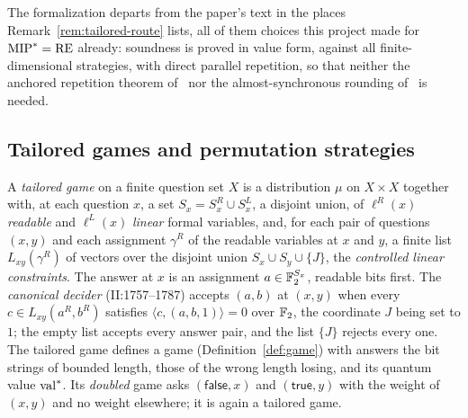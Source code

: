 The formalization departs from the paper's text in the places Remark~\ref{rem:tailored-route}
lists, all of them choices this project made for $\mathrm{MIP}^* = \mathrm{RE}$ already: soundness is proved
in value form, against all finite-dimensional strategies, with direct parallel repetition, so
that neither the anchored repetition theorem of~\cite{BVY17} nor the almost-synchronous
rounding of~\cite{Vid22} is needed.

\subsection{Tailored games and permutation strategies}

\begin{definition}
\label{def:tailored-game}
\leanok
A \emph{tailored game} on a finite question set $X$ is a distribution $\mu$ on $X \times X$
together with, at each question $x$, a set $S_x = S_x^R \cup S_x^L$, a disjoint union, of $\ell^R(x)$
\emph{readable} and $\ell^L(x)$ \emph{linear} formal variables, and, for each pair of questions
$(x, y)$ and each assignment $\gamma^R$ of the readable variables at $x$ and $y$, a finite list
$L_{xy}(\gamma^R)$ of vectors over the disjoint union $S_x \cup S_y \cup \{J\}$, the \emph{controlled linear
constraints}. The answer at $x$ is an assignment $a \in \mathbb{F}_2^{S_x}$, readable bits first. The
\emph{canonical decider} (II:1757--1787) accepts $(a, b)$ at $(x, y)$ when every
$c \in L_{xy}(a^R, b^R)$ satisfies $\langle c, (a, b, 1)\rangle = 0$ over $\mathbb{F}_2$, the
coordinate $J$ being set to $1$; the empty list accepts every answer pair, and the list
$\{J\}$ rejects every one. The tailored game defines a game (Definition~\ref{def:game}) with
answers the bit strings of bounded length, those of the wrong length losing, and its quantum
value $\mathrm{val}^*$. Its \emph{doubled} game asks $(\mathsf{false}, x)$ and $(\mathsf{true}, y)$
with the weight of $(x, y)$ and no weight elsewhere; it is again a tailored game.
\end{definition}

